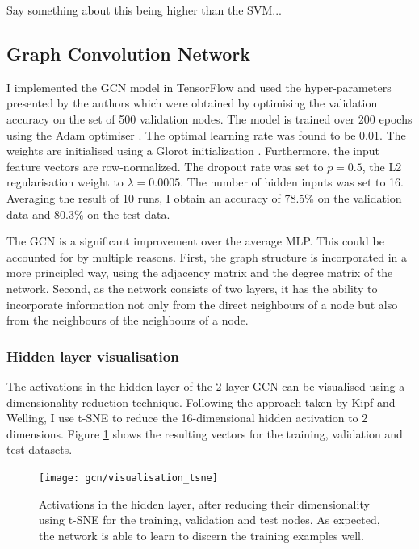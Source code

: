 \documentclass[12pt]{article}
\theoremstyle{definition}
\begin{document}
\bigskip

Say something about this being higher than the SVM...

\subsection{Graph Convolution Network}

I implemented the GCN model in TensorFlow and used the hyper-parameters presented by the authors which were obtained by optimising the validation accuracy on the set of 500 validation nodes. The model is trained over 200 epochs using the Adam optimiser \cite{kingma2014adam}. The optimal learning rate was found to be 0.01. The weights are initialised using a Glorot initialization \cite{glorot2010understanding}. Furthermore, the input feature vectors are row-normalized. The dropout rate was set to $p=0.5$, the L2 regularisation weight to $\lambda=0.0005$. The number of hidden inputs was set to 16. Averaging the result of 10 runs, I obtain an accuracy of 78.5\% on the validation data and 80.3\% on the test data.

\bigskip

The GCN is a significant improvement over the average MLP. This could be accounted for by multiple reasons. First, the graph structure is incorporated in a more principled way, using the adjacency matrix and the degree matrix of the network. Second, as the network consists of two layers, it has the ability to incorporate information not only from the direct neighbours of a node but also from the neighbours of the neighbours of a node.

\subsubsection{Hidden layer visualisation}

The activations in the hidden layer of the 2 layer GCN can be visualised using a dimensionality reduction technique. Following the approach taken by Kipf and Welling, I use t-SNE \cite{maaten2008visualizing} to reduce the 16-dimensional hidden activation to 2 dimensions. Figure \ref{fig/gcn_tsne} shows the resulting vectors for the training, validation and test datasets.

\begin{figure}[h]
	\texttt{[image: gcn/visualisation\_tsne]}
	\centering
	\caption{Activations in the hidden layer, after reducing their dimensionality using t-SNE for the training, validation and test nodes. As expected, the network is able to learn to discern the training examples well.}
	\label{fig/gcn_tsne}
\end{figure}
\end{document}
